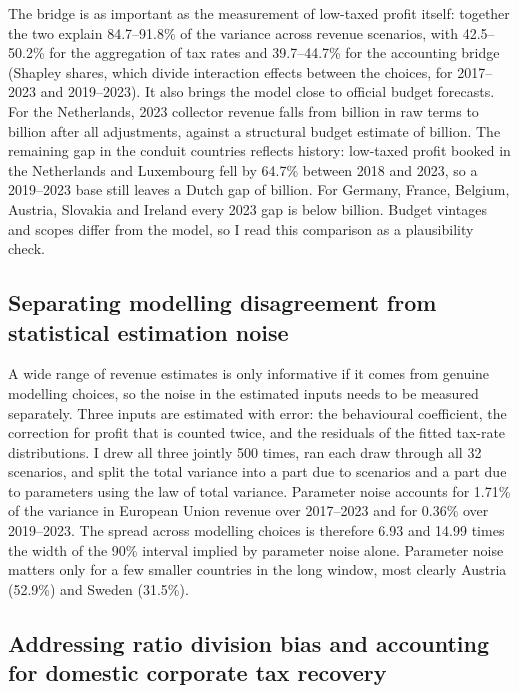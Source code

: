 \documentclass[11pt,a4paper]{article}
\newcommand{\EUR}{\texteuro}
\begin{document}
The bridge is as important as the measurement of low-taxed profit itself: together the two explain 84.7–91.8\% of the variance across revenue scenarios, with 42.5–50.2\% for the aggregation of tax rates and 39.7–44.7\% for the accounting bridge (Shapley shares, which divide interaction effects between the choices, for 2017–2023 and 2019–2023). It also brings the model close to official budget forecasts. For the Netherlands, 2023 collector revenue falls from \EUR6.68 billion in raw terms to \EUR0.42 billion after all adjustments, against a structural budget estimate of \EUR0.18 billion. The remaining gap in the conduit countries reflects history: low-taxed profit booked in the Netherlands and Luxembourg fell by 64.7\% between 2018 and 2023, so a 2019–2023 base still leaves a Dutch gap of \EUR3.18 billion. For Germany, France, Belgium, Austria, Slovakia and Ireland every 2023 gap is below \EUR0.5 billion. Budget vintages and scopes differ from the model, so I read this comparison as a plausibility check.

\subsection{Separating modelling disagreement from statistical estimation noise}

A wide range of revenue estimates is only informative if it comes from genuine modelling choices, so the noise in the estimated inputs needs to be measured separately. Three inputs are estimated with error: the behavioural coefficient, the correction for profit that is counted twice, and the residuals of the fitted tax-rate distributions. I drew all three jointly 500 times, ran each draw through all 32 scenarios, and split the total variance into a part due to scenarios and a part due to parameters using the law of total variance. Parameter noise accounts for 1.71\% of the variance in European Union revenue over 2017–2023 and for 0.36\% over 2019–2023. The spread across modelling choices is therefore 6.93 and 14.99 times the width of the 90\% interval implied by parameter noise alone. Parameter noise matters only for a few smaller countries in the long window, most clearly Austria (52.9\%) and Sweden (31.5\%).

\subsection{Addressing ratio division bias and accounting for domestic corporate tax recovery}
\end{document}
